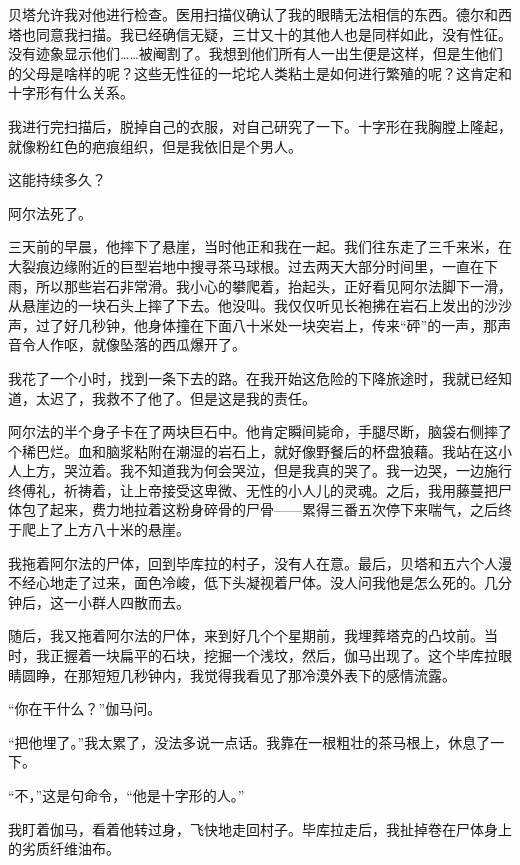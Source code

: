 \documentclass[AutoFakeBold=true]{book}
\begin{document}
贝塔允许我对他进行检查。医用扫描仪确认了我的眼睛无法相信的东西。德尔和西塔也同意我扫描。我已经确信无疑，三廿又十的其他人也是同样如此，没有性征。没有迹象显示他们……被阉割了。我想到他们所有人一出生便是这样，但是生他们的父母是啥样的呢？这些无性征的一坨坨人类粘土是如何进行繁殖的呢？这肯定和十字形有什么关系。

我进行完扫描后，脱掉自己的衣服，对自己研究了一下。十字形在我胸膛上隆起，就像粉红色的疤痕组织，但是我依旧是个男人。

这能持续多久？

\vspace*{1em}{\kaishu 第一百三十三日：}

阿尔法死了。

三天前的早晨，他摔下了悬崖，当时他正和我在一起。我们往东走了三千来米，在大裂痕边缘附近的巨型岩地中搜寻茶马球根。过去两天大部分时间里，一直在下雨，所以那些岩石非常滑。我小心的攀爬着，抬起头，正好看见阿尔法脚下一滑，从悬崖边的一块石头上摔了下去。他没叫。我仅仅听见长袍拂在岩石上发出的沙沙声，过了好几秒钟，他身体撞在下面八十米处一块突岩上，传来``砰''的一声，那声音令人作呕，就像坠落的西瓜爆开了。

我花了一个小时，找到一条下去的路。在我开始这危险的下降旅途时，我就已经知道，太迟了，我救不了他了。但是这是我的责任。

阿尔法的半个身子卡在了两块巨石中。他肯定瞬间毙命，手腿尽断，脑袋右侧摔了个稀巴烂。血和脑浆粘附在潮湿的岩石上，就好像野餐后的杯盘狼藉。我站在这小人上方，哭泣着。我不知道我为何会哭泣，但是我真的哭了。我一边哭，一边施行终傅礼，祈祷着，让上帝接受这卑微、无性的小人儿的灵魂。之后，我用藤蔓把尸体包了起来，费力地拉着这粉身碎骨的尸骨——累得三番五次停下来喘气，之后终于爬上了上方八十米的悬崖。

我拖着阿尔法的尸体，回到毕库拉的村子，没有人在意。最后，贝塔和五六个人漫不经心地走了过来，面色冷峻，低下头凝视着尸体。没人问我他是怎么死的。几分钟后，这一小群人四散而去。

随后，我又拖着阿尔法的尸体，来到好几个个星期前，我埋葬塔克的凸坟前。当时，我正握着一块扁平的石块，挖掘一个浅坟，然后，伽马出现了。这个毕库拉眼睛圆睁，在那短短几秒钟内，我觉得我看见了那冷漠外表下的感情流露。

``你在干什么？''伽马问。

``把他埋了。''我太累了，没法多说一点话。我靠在一根粗壮的茶马根上，休息了一下。

``不，''这是句命令，``他是十字形的人。''

我盯着伽马，看着他转过身，飞快地走回村子。毕库拉走后，我扯掉卷在尸体身上的劣质纤维油布。
\end{document}
